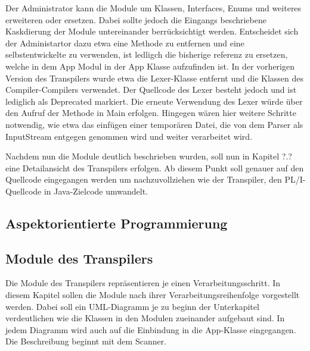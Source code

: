 Der Administrator kann die Module um Klassen, Interfaces, Enums und weiteres erweiteren oder ersetzen.
Dabei sollte jedoch die Eingangs beschriebene Kaskdierung der Module untereinander berrücksichtigt werden.
Entscheidet sich der Administartor dazu etwa eine Methode zu entfernen und eine selbstentwickelte zu verwenden, ist ledligch die bisherige 
referenz zu ersetzen, welche in dem App Modul in der App Klasse aufzufinden ist.
In der vorherigen Version des Transpilers wurde etwa die Lexer-Klasse entfernt und die Klassen des Compiler-Compilers verwendet.
Der Quellcode des Lexer besteht jedoch und ist lediglich als Deprecated markiert. Die erneute Verwendung des Lexer würde über den Aufruf der Methode in Main erfolgen.
Hingegen wären hier weitere Schritte notwendig, wie etwa das einfügen einer temporären Datei, die von dem Parser als InputStream entgegen genommen wird und weiter verarbeitet wird.

Nachdem nun die Module deutlich beschrieben wurden, soll nun in Kapitel ?.? eine Detailansicht des Transpilers erfolgen.
Ab diesem Punkt soll genauer auf den Quellcode eingegangen werden um nachzuvollziehen wie der Transpiler, den PL/I-Quellcode
in Java-Zielcode umwandelt.


\subsection{Aspektorientierte Programmierung}
 
\subsection{Module des Transpilers}
Die Module des Transpilers repräsentieren je einen Verarbeitungsschritt.
In diesem Kapitel sollen die Module nach ihrer Verarbeitungsreihenfolge vorgestellt werden.
Dabei soll ein UML-Diagramm je zu beginn der Unterkapitel verdeutlichen wie die Klassen
in den Modulen zueinander aufgebaut sind. In jedem Diagramm wird auch auf die Einbindung in die App-Klasse
 eingegangen.
Die Beschreibung beginnt mit dem Scanner.

